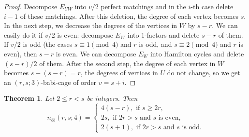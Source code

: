 \documentclass[a4paper,11pt]{article}
\newtheorem{theorem}{Theorem}[section]
\begin{document}
\begin{proof}
Decompose $E_{UW}$ into $v/2$ perfect matchings and in the $i$-th case delete $i-1$ of these matchings. After this deletion, the degree of each vertex becomes $s$. In the next step, we decrease
the degrees of the vertices in $W$ by $s-r$. We can easily do it if $v/2$ is even: decompose $E_W$ into
1-factors and delete $s-r$ of them. If $v/2$ is odd (the cases $s\equiv 1\pmod 4$ and $r$ is odd, and 
 $s\equiv 2\pmod 4$ and $r$ is even), then $s-r$ is even. We can decompose $E_W$ into
Hamilton cycles and delete $(s-r)/2$ of them. After the second step, the degree of each vertex 
in $W$ becomes $s-(s-r)=r$, the degrees of vertices in $U$ do not change, so we get 
an $(r,s;3)$-babi-cage of order $v=s+i$.
\end {proof}


\begin{theorem}
Let $2\leq r<s$ be integers. Then 
$$n_{bb}(r,s;4)=
\begin{cases}
4(s-r), \text{ if } s \geq 2r,  \\ 
2s, \text{ if } 2r>s \text{ and } s \text{ is even}, \\ 
2(s+1), \text{ if } 2r>s \text{ and } s \text{ is odd}.
\end{cases}
$$
\end{theorem}
\end{document}
